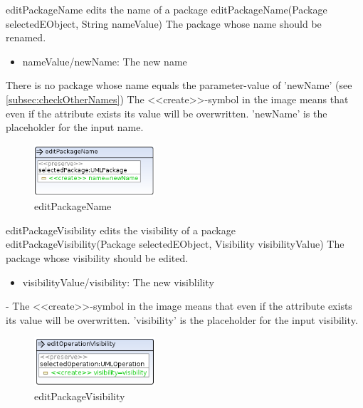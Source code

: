 \op
{editPackageName}
{edits the name of a package}
{editPackageName(Package selectedEObject, String nameValue)}
{The package whose name should be renamed.}
{
\begin{itemize}
 \item nameValue/newName: The new name
\end{itemize}
}
{There is no package whose name equals the parameter-value of 'newName' (see
\ref{subsec:checkOtherNames})}
{The 	\textless\textless create\textgreater\textgreater  -symbol in the image
means that even if the attribute exists its value will be overwritten. 'newName'
is the placeholder for the input name.}
\begin{figure}[H]
  \centering
  \includegraphics[width=0.4\textwidth]{pics/editPackageName.png}
  \caption{editPackageName}
  \label{editPackageName}
\end{figure}

\op
{editPackageVisibility}
{edits the visibility of a package}
{editPackageVisibility(Package selectedEObject, Visibility visibilityValue)}
{The package whose visibility should be edited.}
{
\begin{itemize}
 \item visibilityValue/visibility: The new visiblility
\end{itemize}
}
{-}
{The 	\textless\textless create\textgreater\textgreater  -symbol in the image
means that even if the attribute exists its value will be overwritten.
'visibility' is the placeholder for the input visibility.}
\begin{figure}[H]
  \centering
  \includegraphics[width=0.4\textwidth]{pics/editPackageVisibility.png}
  \caption{editPackageVisibility}
  \label{addPackage-execute}
\end{figure}

